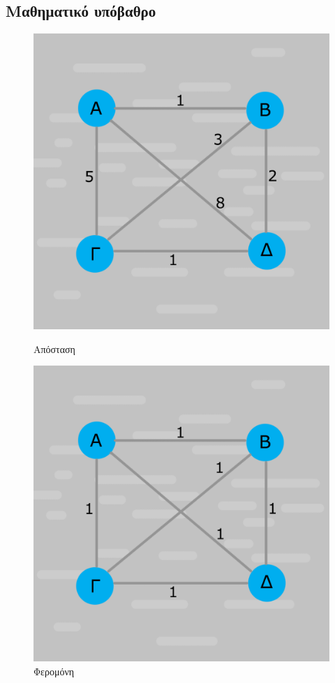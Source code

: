 \subsection{Μαθηματικό υπόβαθρο}

\begin{figure}[ht]
    \begin{minipage}[c]{.46\linewidth}
        \centering
        \includegraphics[scale=0.15]{2947_thesis/pictures/apostaseis.png}
        \caption{Απόσταση}
        \label{distance}
    \end{minipage}
    \begin{minipage}[c]{.46\linewidth}
        \centering
        \includegraphics[scale=0.15]{2947_thesis/pictures/feromoni.png}
        \caption{Φερομόνη}
        \label{pher}
    \end{minipage}
\end{figure}
